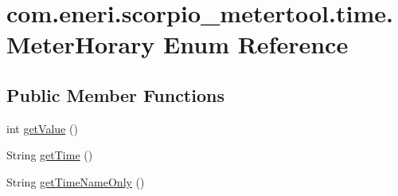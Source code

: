 \hypertarget{enumcom_1_1eneri_1_1scorpio__metertool_1_1time_1_1_meter_horary}{}\section{com.\+eneri.\+scorpio\+\_\+metertool.\+time.\+Meter\+Horary Enum Reference}
\label{enumcom_1_1eneri_1_1scorpio__metertool_1_1time_1_1_meter_horary}
\subsection*{Public Member Functions}
\begin{DoxyCompactItemize}
\item 
int \hyperlink{enumcom_1_1eneri_1_1scorpio__metertool_1_1time_1_1_meter_horary_aa6e8d37d7da842a4f080df953bd0a25f}{get\+Value} ()
\item 
String \hyperlink{enumcom_1_1eneri_1_1scorpio__metertool_1_1time_1_1_meter_horary_a2a348e784f7f419bcd840401bda2eb83}{get\+Time} ()
\item 
String \hyperlink{enumcom_1_1eneri_1_1scorpio__metertool_1_1time_1_1_meter_horary_ae3d5da68216e111c4faa5e95e4a8ada0}{get\+Time\+Name\+Only} ()
\end{DoxyCompactItemize}
